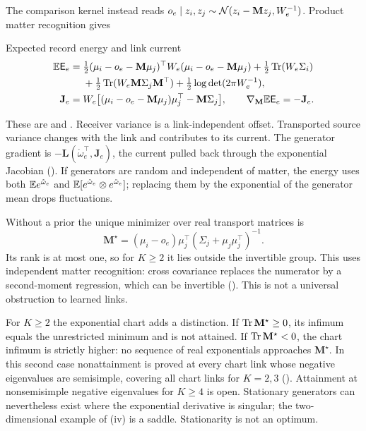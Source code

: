The comparison kernel instead reads
\(o_e\mid z_i,z_j\sim\mathcal N(z_i-\mathbf Mz_j,W_e^{-1})\). Product matter recognition gives
\begin{keyequation}{Expected record energy and link current}
\[
\begin{aligned}
\mathbb E\mathsf E_e
={}&\tfrac12(\mu_i-o_e-\mathbf M\mu_j)^\top W_e(\mu_i-o_e-\mathbf M\mu_j)
+\tfrac12\operatorname{Tr}(W_e\Sigma_i)\\
&+\tfrac12\operatorname{Tr}(W_e\mathbf M\Sigma_j\mathbf M^\top)
+\tfrac12\log\det(2\pi W_e^{-1}),\\
\mathbf J_e={}&W_e\bigl[(\mu_i-o_e-\mathbf M\mu_j)\mu_j^\top-\mathbf M\Sigma_j\bigr],
\qquad \nabla_{\mathbf M}\mathbb E\mathsf E_e=-\mathbf J_e.
\end{aligned}
\]
\end{keyequation}
These are  and . Receiver variance is a
link-independent offset. Transported source variance changes with the link and contributes to
its current. The generator gradient is \(-\mathbf L(\mathring\omega_e^\top,\mathbf J_e)\),
the current pulled back through the exponential Jacobian (). If
generators are random and independent of matter, the energy uses both
\(\mathbb E e^{\mathring\omega_e}\) and
\(\mathbb E[e^{\mathring\omega_e}\otimes e^{\mathring\omega_e}]\); replacing them by the exponential of
the generator mean drops fluctuations.

Without a prior the unique minimizer over real transport matrices is
\[
\mathbf M^\star=(\mu_i-o_e)\mu_j^\top(\Sigma_j+\mu_j\mu_j^\top)^{-1}.
\]
Its rank is at most one, so for \(K\geq2\) it lies outside the invertible group. This uses
independent matter recognition: cross covariance replaces the numerator by a second-moment
regression, which can be invertible (). This is not a universal
obstruction to learned links.

For $K\geq2$ the exponential chart adds a distinction. If \(\operatorname{Tr}\mathbf M^\star\geq0\), its infimum equals
the unrestricted minimum and is not attained. If \(\operatorname{Tr}\mathbf M^\star<0\), the chart infimum is
strictly higher: no sequence of real exponentials approaches \(\mathbf M^\star\). In this second
case nonattainment is proved at every chart link whose negative eigenvalues are semisimple,
covering all chart links for \(K=2,3\) (). Attainment at
nonsemisimple negative eigenvalues for \(K\geq4\) is open. Stationary generators can nevertheless
exist where the exponential derivative is singular; the two-dimensional example of
(iv) is a saddle. Stationarity is not an optimum.

